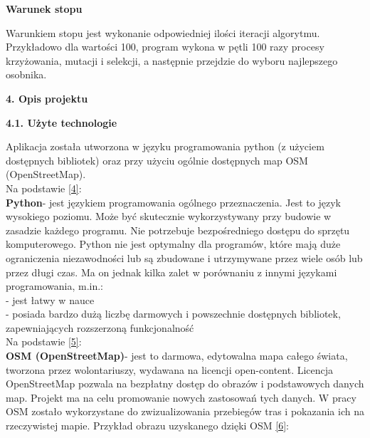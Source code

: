\documentclass[a4paper, twoside, 12pt, justified]{article}
\begin{document}
	\begin{center}
		\textbf{Warunek stopu}
	\end{center}

	Warunkiem stopu jest wykonanie odpowiedniej ilości iteracji algorytmu. Przykładowo dla wartości 100, program wykona w pętli 100 razy procesy krzyżowania, mutacji i selekcji, a następnie przejdzie do wyboru najlepszego osobnika.\\
	
	\newpage
	\begin{flushleft}
		\begin{LARGE}
			\textbf{4. Opis projektu}
		\end{LARGE}
	\end{flushleft}
	
	\vspace{5mm} %
	
	\begin{flushleft}
		\begin{large}
			\textbf{4.1. Użyte technologie}
		\end{large}
	\end{flushleft}
	\vspace{10mm} %
	
	 Aplikacja została utworzona w języku programowania python (z użyciem dostępnych bibliotek) oraz przy użyciu ogólnie dostępnych map OSM (OpenStreetMap).\\
	 Na podstawie \hyperlink{python}{[4]}:\\
	 \textbf{Python}- jest językiem programowania ogólnego przeznaczenia. Jest to język wysokiego poziomu. Może być skutecznie wykorzystywany przy budowie w zasadzie każdego programu. Nie potrzebuje bezpośredniego dostępu do sprzętu komputerowego. Python nie jest optymalny dla programów, które mają duże ograniczenia niezawodności lub są zbudowane i utrzymywane przez wiele osób lub przez długi czas. Ma on jednak kilka zalet w porównaniu z innymi językami programowania, m.in.:\\
	 - jest łatwy w nauce\\ 
	 - posiada bardzo dużą liczbę darmowych i powszechnie dostępnych bibliotek, zapewniających rozszerzoną funkcjonalność\\ 
	 
	 Na podstawie \hyperlink{osm}{[5]}:\\
	 \textbf{OSM (OpenStreetMap)}- jest to darmowa, edytowalna mapa całego świata, tworzona przez wolontariuszy, wydawana na licencji open-content. Licencja OpenStreetMap pozwala na bezpłatny dostęp do obrazów i podstawowych danych map. Projekt ma na celu promowanie nowych zastosowań tych danych. W pracy OSM zostało wykorzystane do zwizualizowania przebiegów tras i pokazania ich na rzeczywistej mapie. Przykład obrazu uzyskanego dzięki OSM \hyperlink{osm_photo}{[6]}: \\
	 
\end{document}
